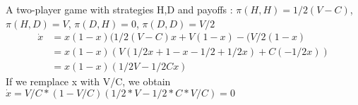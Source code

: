 \documentclass[11pt]{article}
\begin{document}
\section{}
A two-player game with strategies H,D and payoffs :  $\pi(H,H) = 1/2(V-C) $, $\pi(H,D) = V $, $\pi(D,H) = 0 $, $\pi(D,D) = V/2 $
\begin{align*}
\dot{x} & = x(1-x)(1/2(V-C)x+V(1-x)-(V/2(1-x) \\
& = x(1-x)(V(1/2x+1-x-1/2+1/2x) + C(-1/2x)) \\
& = x(1-x)(1/2V - 1/2Cx)
\end{align*}
If we remplace x with V/C, we obtain $\dot{x} = V/C*(1-V/C)(1/2*V-1/2*C*V/C) = 0$
\end{document}
